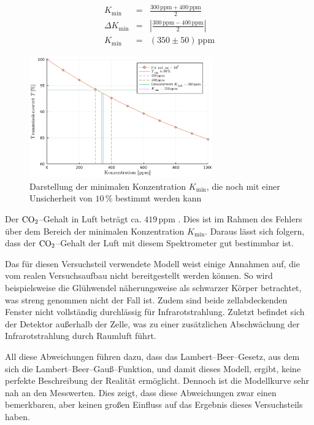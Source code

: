 \documentclass[12pt,a4paper]{scrartcl}
\numberwithin{equation}{section} %
\begin{document}
	\begin{eqnarray}
		K_\mathrm{min} &=&  \frac{300 \mathrm{\, ppm} + 400 \mathrm{\, ppm}}{2} \\
		\Delta K_\mathrm{min} &=& \left|\frac{300 \mathrm{\, ppm} - 400 \mathrm{\, ppm}}{2}\right| \\
		K_\mathrm{min} &=& (350 \pm 50) \mathrm{\, ppm}
	\end{eqnarray}
	
	\begin{figure}[h]
		\centering
		\includegraphics[width=0.7\textwidth]{../media/B1.1/fitZoomPpm.pdf}
		\caption{Darstellung der minimalen Konzentration $K_\mathrm{min}$,
			die noch mit einer Unsicherheit von $10 \mathrm{\, \%}$ bestimmt werden kann}
		\label{abb:fitZoom}
	\end{figure}
	
	\noindent
	Der $\ce{CO_2}$--Gehalt in Luft beträgt ca. $419 \mathrm{\, ppm}$ \cite{Kohlendioxid Anteil}.
	Dies ist im Rahmen des Fehlers über dem Bereich der minimalen Konzentration $K_\mathrm{min}$. Daraus lässt sich folgern, dass der $\ce{CO_2}$--Gehalt der Luft mit diesem Spektrometer gut bestimmbar ist.
	
	Das für diesen Versuchsteil verwendete Modell weist einige Annahmen auf, die vom realen Versuchsaufbau nicht bereitgestellt werden können. So wird beispielsweise die Glühwendel näherungsweise als schwarzer Körper betrachtet, was streng genommen nicht der Fall ist. Zudem sind beide zellabdeckenden Fenster nicht vollständig durchlässig für Infrarotstrahlung. Zuletzt befindet sich der Detektor außerhalb der Zelle, was zu einer zusätzlichen Abschwächung der Infrarotstrahlung durch Raumluft führt.
	
	All diese Abweichungen führen dazu, dass das Lambert--Beer--Gesetz, aus dem sich die Lambert--Beer--Gauß--Funktion, und damit dieses Modell, ergibt, keine perfekte Beschreibung der Realität ermöglicht. Dennoch ist die Modellkurve sehr nah an den Messwerten. Dies zeigt, dass diese Abweichungen zwar einen bemerkbaren, aber keinen großen Einfluss auf das Ergebnis dieses Versuchsteils haben.
	
\end{document}
